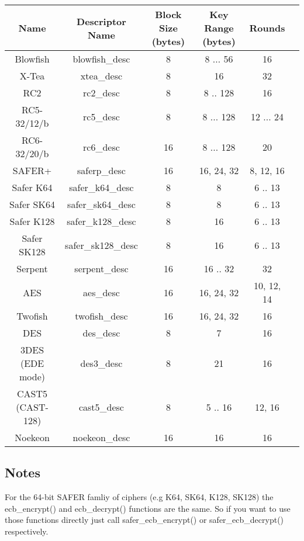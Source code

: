 \documentclass{book}
\begin{document}
\begin{small}
\begin{center}
\begin{tabular}{|c|c|c|c|c|c|}
     \hline Name & Descriptor Name & Block Size (bytes) & Key Range (bytes) & Rounds \\
     \hline Blowfish & blowfish\_desc & 8 & 8 ... 56 & 16 \\
     \hline X-Tea & xtea\_desc & 8 & 16 & 32 \\
     \hline RC2 & rc2\_desc & 8 & 8 .. 128 & 16 \\
     \hline RC5-32/12/b & rc5\_desc & 8 & 8 ... 128 & 12 ... 24 \\
     \hline RC6-32/20/b & rc6\_desc & 16 & 8 ... 128 & 20 \\
     \hline SAFER+ & saferp\_desc &16 & 16, 24, 32 & 8, 12, 16 \\
     \hline Safer K64   & safer\_k64\_desc & 8 & 8 & 6 .. 13 \\
     \hline Safer SK64  & safer\_sk64\_desc & 8 & 8 & 6 .. 13 \\
     \hline Safer K128  & safer\_k128\_desc & 8 & 16 & 6 .. 13 \\
     \hline Safer SK128 & safer\_sk128\_desc & 8 & 16 & 6 .. 13 \\
     \hline Serpent & serpent\_desc & 16 & 16 .. 32 & 32 \\
     \hline AES & aes\_desc & 16 & 16, 24, 32 & 10, 12, 14 \\
     \hline Twofish & twofish\_desc & 16 & 16, 24, 32 & 16 \\
     \hline DES & des\_desc & 8 & 7 & 16 \\
     \hline 3DES (EDE mode) & des3\_desc & 8 & 21 & 16 \\
     \hline CAST5 (CAST-128) & cast5\_desc & 8 & 5 .. 16 & 12, 16 \\
     \hline Noekeon & noekeon\_desc & 16 & 16 & 16 \\
     \hline
\end{tabular}
\end{center}
\end{small}

\subsection{Notes}
For the 64-bit SAFER famliy of ciphers (e.g K64, SK64, K128, SK128) the ecb\_encrypt() and ecb\_decrypt()
functions are the same.  So if you want to use those functions directly just call safer\_ecb\_encrypt()
or safer\_ecb\_decrypt() respectively.
\end{document}
